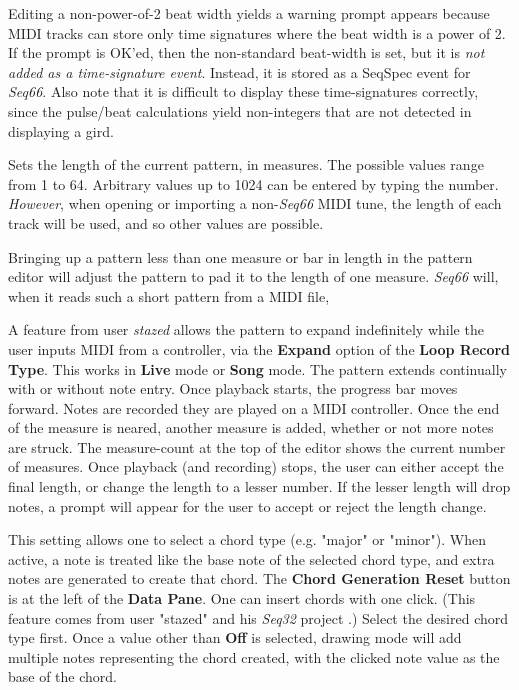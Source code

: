    Editing a non-power-of-2 beat width yields a warning prompt appears because MIDI tracks can store only time
   signatures where the beat width is a power of 2.
   If the prompt is OK'ed, then the non-standard beat-width is set,
   but it is \textsl{not added as a time-signature event}.
   Instead, it is stored as a SeqSpec event for \textsl{Seq66}.
   Also note that it is difficult to display these time-signatures
   correctly, since the pulse/beat calculations yield non-integers that are
   not detected in displaying a gird.

   Sets the length of the current pattern, in measures.
   The possible values range from 1 to 64.
   Arbitrary values up to 1024 can be entered by typing the number.
   \textsl{However}, when opening or importing a non-\textsl{Seq66}
   MIDI tune, the length of each track will be used, and so other values
   are possible.

   Bringing up a pattern less than one measure or bar in
   length in the pattern editor will adjust the pattern to pad it to the
   length of one measure.
   \textsl{Seq66} will, when it reads such a short pattern
   from a MIDI file,

   A feature from user \textsl{stazed} allows the pattern to expand
   indefinitely while the user inputs MIDI from a controller, via the
   \textbf{Expand} option of the \textbf{Loop Record Type}.
   This works in \textbf{Live} mode or \textbf{Song} mode.
   The pattern extends continually with or without note entry.
   Once playback starts, the progress bar moves forward.
   Notes are recorded they are played on a MIDI controller.
   Once the end of the measure is neared, another
   measure is added, whether or not more notes are struck.
   The measure-count at the top of the editor shows the current number
   of measures.
   Once playback (and recording) stops, the user can either accept the
   final length, or change the length to a lesser number.
   If the lesser length will drop notes, a prompt will appear
   for the user to accept or reject the length change.

   This setting allows one to select a chord type (e.g. "major" or "minor").
   When active, a note is treated like the base note of the selected chord
   type, and extra notes are generated to create that chord.
   The \textbf{Chord Generation Reset} button is at the left of the
   \textbf{Data Pane}.
   One can insert chords with one click.
   (This feature comes from user "stazed"
   and his \textsl{Seq32} project \cite{seq32}.)
   Select the desired chord type first.
   Once a value other than \textbf{Off} is selected,
   drawing mode will add multiple notes representing the chord
   created, with the clicked note value as the base of the chord.

